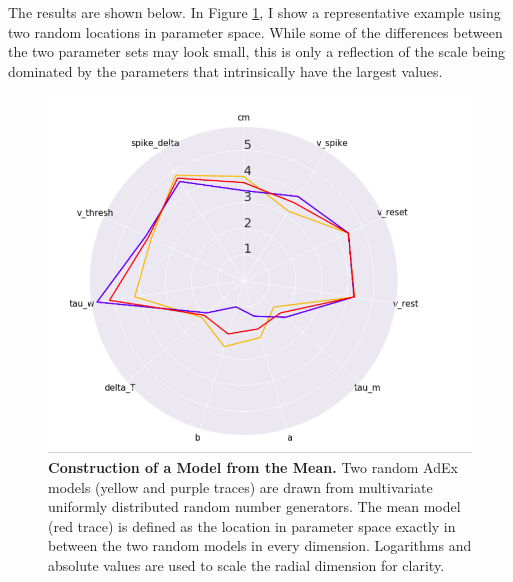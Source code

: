 The results are shown below.
In Figure \ref{fig:mean-model-polar}, I show a representative example using two random locations in parameter space.
While some of the differences between the two parameter sets may look small, this is only a reflection of the scale being dominated by the parameters that intrinsically have the largest values.

\begin{figure}
\begin{center}
\includegraphics[]{figures/polar_coordinates.png}
\caption[Mean of Random Models]{\textbf{Construction of a Model from the Mean.}
Two random AdEx models (yellow and purple traces) are drawn from multivariate uniformly distributed random number generators.
The mean model (red trace) is defined as the location in parameter space exactly in between the two random models in every dimension.
Logarithms and absolute values are used to scale the radial dimension for clarity.}
\label{fig:mean-model-polar}
\end{center}
\end{figure}


